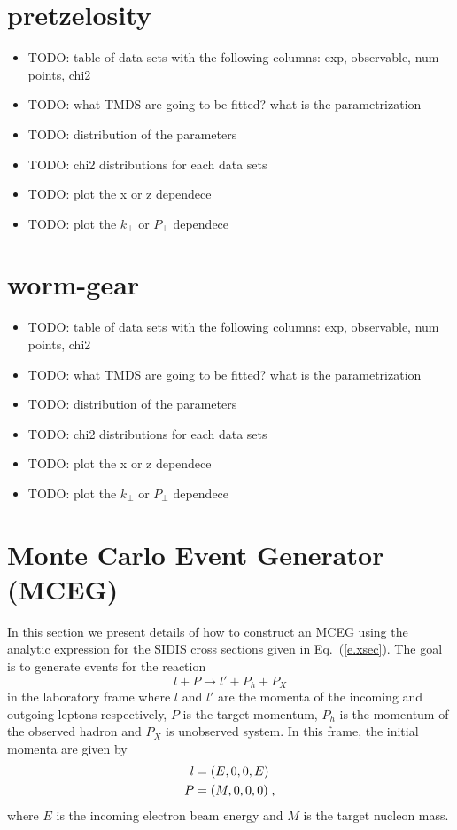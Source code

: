\documentclass[floatfix,aps,prd,nofootinbib,superscriptaddress,preprint]{revtex4}
\newcommand\3[1]{\boldsymbol{#1}}
\newcommand{\eref}[1]{Eq.~(\ref{e.#1})}
\begin{document}
\newpage
\section{pretzelosity}

\begin{itemize}
\item {\color{red} TODO: table of data sets with the following columns: exp, observable, num points, chi2 }
\item {\color{red} TODO: what TMDS are going to be fitted? what is the parametrization}
\item {\color{red} TODO: distribution of the parameters}
\item {\color{red} TODO: chi2 distributions for each data sets}
\item {\color{red} TODO: plot the x or z dependece}
\item {\color{red} TODO: plot the $k_{\perp}$ or $P_{\perp}$ dependece}
\end{itemize}

\newpage
\section{worm-gear}

\begin{itemize}
\item {\color{red} TODO: table of data sets with the following columns: exp, observable, num points, chi2 }
\item {\color{red} TODO: what TMDS are going to be fitted? what is the parametrization}
\item {\color{red} TODO: distribution of the parameters}
\item {\color{red} TODO: chi2 distributions for each data sets}
\item {\color{red} TODO: plot the x or z dependece}
\item {\color{red} TODO: plot the $k_{\perp}$ or $P_{\perp}$ dependece}
\end{itemize}



\newpage
\section{Monte Carlo Event Generator (MCEG)}

In this section we present details of how to construct an MCEG using
the analytic expression for the SIDIS cross sections given in
\eref{xsec}. The goal is to generate events for the reaction 
$$l+P\to l'+P_h+P_X$$
in the laboratory frame where $l$ and $l'$ are the momenta of the
incoming and outgoing leptons respectively, $P$ is the target
momentum, $P_h$ is the momentum of the observed hadron and $P_X$ is
unobserved system. In this frame, the initial momenta are given by  
%
\begin{align}
l&=(E,0,0,E)\notag\\
P&=(M,0,0,0)
\; ,
\end{align}
%
where $E$ is the incoming electron beam energy and $M$ is the target
nucleon mass. 
\end{document}
